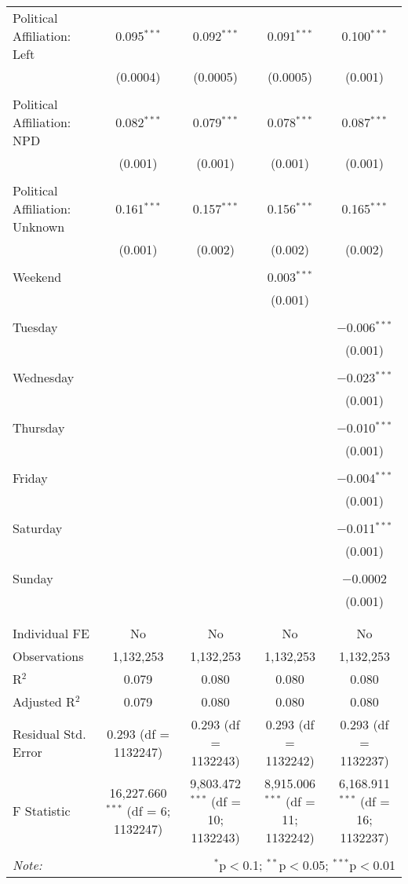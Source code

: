 \documentclass[
]{article}
\begin{document}
\begin{table}[!htbp]
{\begin{tabular}{@{\extracolsep{5pt}}lcccc}
 Political Affiliation: Left & 0.095$^{***}$ & 0.092$^{***}$ & 0.091$^{***}$ & 0.100$^{***}$ \\ 
  & (0.0004) & (0.0005) & (0.0005) & (0.001) \\ 
  & & & & \\ 
 Political Affiliation: NPD & 0.082$^{***}$ & 0.079$^{***}$ & 0.078$^{***}$ & 0.087$^{***}$ \\ 
  & (0.001) & (0.001) & (0.001) & (0.001) \\ 
  & & & & \\ 
 Political Affiliation: Unknown & 0.161$^{***}$ & 0.157$^{***}$ & 0.156$^{***}$ & 0.165$^{***}$ \\ 
  & (0.001) & (0.002) & (0.002) & (0.002) \\ 
  & & & & \\ 
 Weekend &  &  & 0.003$^{***}$ &  \\ 
  &  &  & (0.001) &  \\ 
  & & & & \\ 
 Tuesday &  &  &  & $-$0.006$^{***}$ \\ 
  &  &  &  & (0.001) \\ 
  & & & & \\ 
 Wednesday &  &  &  & $-$0.023$^{***}$ \\ 
  &  &  &  & (0.001) \\ 
  & & & & \\ 
 Thursday &  &  &  & $-$0.010$^{***}$ \\ 
  &  &  &  & (0.001) \\ 
  & & & & \\ 
 Friday &  &  &  & $-$0.004$^{***}$ \\ 
  &  &  &  & (0.001) \\ 
  & & & & \\ 
 Saturday &  &  &  & $-$0.011$^{***}$ \\ 
  &  &  &  & (0.001) \\ 
  & & & & \\ 
 Sunday &  &  &  & $-$0.0002 \\ 
  &  &  &  & (0.001) \\ 
  & & & & \\ 
\hline \\[-1.8ex] 
Individual FE & No & No & No & No \\ 
Observations & 1,132,253 & 1,132,253 & 1,132,253 & 1,132,253 \\ 
R$^{2}$ & 0.079 & 0.080 & 0.080 & 0.080 \\ 
Adjusted R$^{2}$ & 0.079 & 0.080 & 0.080 & 0.080 \\ 
Residual Std. Error & 0.293 (df = 1132247) & 0.293 (df = 1132243) & 0.293 (df = 1132242) & 0.293 (df = 1132237) \\ 
F Statistic & 16,227.660$^{***}$ (df = 6; 1132247) & 9,803.472$^{***}$ (df = 10; 1132243) & 8,915.006$^{***}$ (df = 11; 1132242) & 6,168.911$^{***}$ (df = 16; 1132237) \\ 
\hline 
\hline \\[-1.8ex] 
\textit{Note:}  & \multicolumn{4}{r}{$^{*}$p$<$0.1; $^{**}$p$<$0.05; $^{***}$p$<$0.01} \\ 
\end{tabular}
} 
\end{table} 
\newpage
\end{document}
